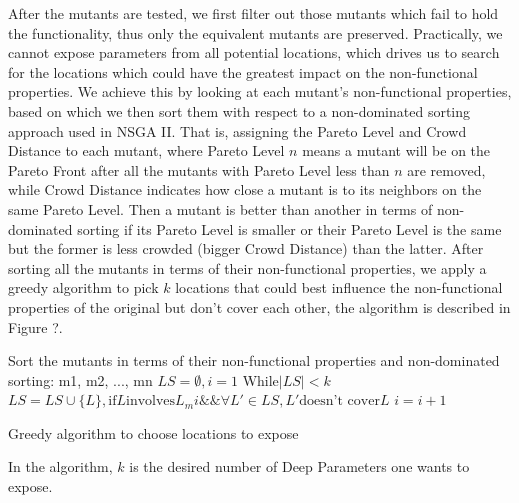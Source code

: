 After the mutants are tested, we first filter out those mutants which fail to hold the functionality, thus only the equivalent mutants are preserved. Practically, we cannot expose parameters from all potential locations, which drives us to search for the locations which could have the greatest impact on the non-functional properties. We achieve this by looking at each mutant's non-functional properties, based on which we then sort them with respect to a non-dominated sorting approach used in NSGA II\cite{}. That is, assigning the Pareto Level and Crowd Distance to each mutant, where Pareto Level $n$ means a mutant will be on the Pareto Front after all the mutants with Pareto Level less than $n$ are removed, while Crowd Distance indicates how close a mutant is to its neighbors on the same Pareto Level. Then a mutant is better than another in terms of non-dominated sorting if its Pareto Level is smaller or their Pareto Level is the same but the former is less crowded (bigger Crowd Distance) than the latter. After sorting all the mutants in terms of their non-functional properties, we apply a greedy algorithm to pick $k$ locations that could best influence the non-functional properties of the original but don't cover each other, the algorithm is described in Figure ?.

\begin{algorithm}
	Sort the mutants in terms of their non-functional properties and non-dominated sorting: m1, m2, ..., mn\;
	$LS=\emptyset, i=1$\;
	While{$|LS|<k$}{
		$LS=LS \cup \{L\}, \text{if} L \text{involves} L_mi \&\& \forall L' \in LS, L' \text{doesn't cover} L$
		$i=i+1$
	}
	\caption{Greedy algorithm to choose locations to expose}
\end{algorithm}

In the algorithm, $k$ is the desired number of Deep Parameters one wants to expose. 
